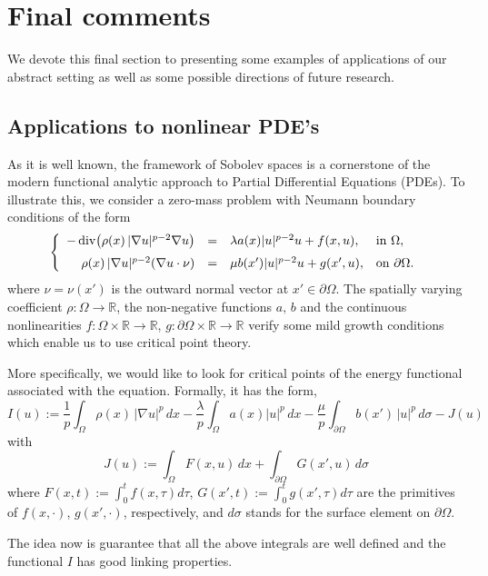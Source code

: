\documentclass[12pt]{amsart}
\theoremstyle{definition}
\theoremstyle{plain}
\begin{document}
\section{Final comments}\label{Final comments} 

We devote this final section to presenting some examples of applications of our abstract setting as well as some possible directions of future research.


\subsection{Applications to nonlinear PDE's}
As it is well known, the framework of Sobolev spaces is a cornerstone of the modern functional analytic approach to Partial Differential Equations (PDEs).
To illustrate this, we consider a  zero-mass problem with Neumann boundary conditions of the form 
\begin{equation}\label{Problem-Neumann}
\left\{
\begin{array}{rcll}
-\operatorname{div}\!\big(\rho(x)\,|\nabla u|^{p-2}\nabla u\big)&=&\lambda a(x)|u|^{p-2}u+ f(x,u), & \text{in } \Omega, \medskip\\ 
\rho(x)\,|\nabla u|^{p-2}(\nabla u \cdot \nu) &=&\mu b(x')|u|^{p-2}u+ g(x',u), & \text{on } \partial\Omega.
\end{array}
\right.
\end{equation}
where $\nu=\nu(x')$ is the outward normal vector at $x'\in\partial\Omega$. The spatially varying coefficient $\rho: \Omega \to \mathbb{R}$, the non-negative functions $a,\,b$ and the continuous nonlinearities $f:\Omega \times \mathbb{R} \to \mathbb{R}$, $g:\partial\Omega \times \mathbb{R} \to \mathbb{R}$ verify some mild growth conditions which enable us to use critical point theory. 

More specifically, we would like to look for critical points of the energy functional associated with the equation. Formally, it has the form,
\[
I(u)
 := \frac{1}{p}\int_\Omega \rho(x)\,|\nabla u|^p\,dx - \frac{\lambda}{p} \int_\Omega a(x) |u|^p\,dx  - \frac{\mu}{p}\int_{\partial\Omega} b(x')\,|u|^p\,d\sigma
   - J(u)
\]
with
$$
J(u) := \int_\Omega F(x,u)\,dx
   + \int_{\partial\Omega} G(x',u)\,d\sigma
$$
where $F(x,t) := \int_0^t f(x,\tau)d\tau$,  $G(x',t):=\int_0^t g(x',\tau)d\tau$ are the primitives of $f(x,\cdot)$, $g(x',\cdot)$, respectively, and $d\sigma$ stands for the surface element on $\partial\Omega$.


The idea now is guarantee that all the above integrals are well defined and the functional $I$ has good linking properties. 
\end{document}
